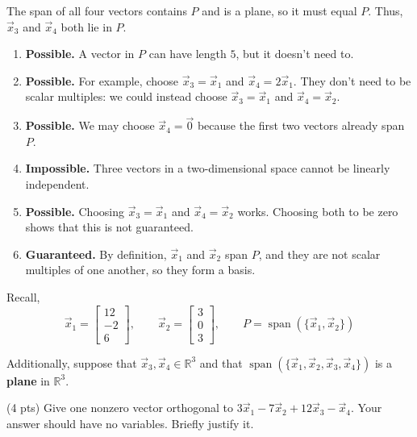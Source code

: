 \documentclass[11pt,twoside]{article}
\begin{document}
\begin{prob}[(19 pts)]
\begin{subprob}
\begin{solution}
The span of all four vectors contains $P$ and is a plane, so it must equal $P$. Thus, $\vec x_3$ and $\vec x_4$ both lie in $P$.
\begin{enumerate}[label=(\roman*)]
\item \textbf{Possible.} A vector in $P$ can have length $5$, but it doesn't need to.
\item \textbf{Possible.} For example, choose $\vec x_3=\vec x_1$ and $\vec x_4=2\vec x_1$. They don't need to be scalar multiples: we could instead choose $\vec x_3=\vec x_1$ and $\vec x_4=\vec x_2$.
\item \textbf{Possible.} We may choose $\vec x_4=\vec0$ because the first two vectors already span $P$.
\item \textbf{Impossible.} Three vectors in a two-dimensional space cannot be linearly independent.
\item \textbf{Possible.} Choosing $\vec x_3=\vec x_1$ and $\vec x_4=\vec x_2$ works. Choosing both to be zero shows that this is not guaranteed.
\item \textbf{Guaranteed.} By definition, $\vec x_1$ and $\vec x_2$ span $P$, and they are not scalar multiples of one another, so they form a basis.
\end{enumerate}
\end{solution}
\end{subprob}



\newpage
Recall,
\[
\vec x_1=\begin{bmatrix}12\\-2\\6\end{bmatrix},\qquad
\vec x_2=\begin{bmatrix}3\\0\\3\end{bmatrix},\qquad
P=\operatorname{span}(\{\vec x_1,\vec x_2\})
\]

Additionally, suppose that $\vec x_3,\vec x_4\in\mathbb R^3$ and that $\operatorname{span}(\{\vec x_1,\vec x_2,\vec x_3,\vec x_4\})$ is a \textbf{plane} in $\mathbb R^3$.

\begin{subprob}(4 pts) Give one nonzero vector orthogonal to $3\vec x_1-7\vec x_2+12\vec x_3-\vec x_4$. Your answer should have no variables. Briefly justify it.
\par\medskip


\end{subprob}
\end{prob}
\end{document}
